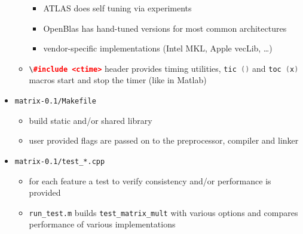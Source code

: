 \documentclass[smaller,a4paper,allowframebreaks]{beamer}
\begin{document}
\begin{frame}[allowframebreaks]
\begin{itemize}
\begin{itemize}
      \begin{itemize}
      \item ATLAS does self tuning via experiments
      \item OpenBlas has hand-tuned versions for most common architectures
      \item vendor-specific implementations (Intel MKL, Apple vecLib, \ldots)\\[3mm]
      \end{itemize} 
\item \lstinline[language=C++]{\#include <ctime>} header provides timing utilities,
      \lstinline[language=C++]{tic ()} and \lstinline[language=C++]{toc (x)} macros
      start and stop the timer (like in Matlab)
\end{itemize}
\item {\tt matrix-0.1/Makefile}\\[3mm]
\begin{itemize}
\item build static and/or shared library\\[3mm]
\item user provided flags are passed on to the preprocessor, compiler and linker
\end{itemize}
\item {\tt matrix-0.1/test\_*.cpp}\\[3mm]
\begin{itemize}
\item for each feature a test to verify consistency and/or performance is provided\\[3mm]
\item {\tt run\_test.m} builds {\tt test\_matrix\_mult} with various options and
      compares performance of various implementations\\[3mm]
\end{itemize}
\end{itemize}


\end{frame}
\end{document}
